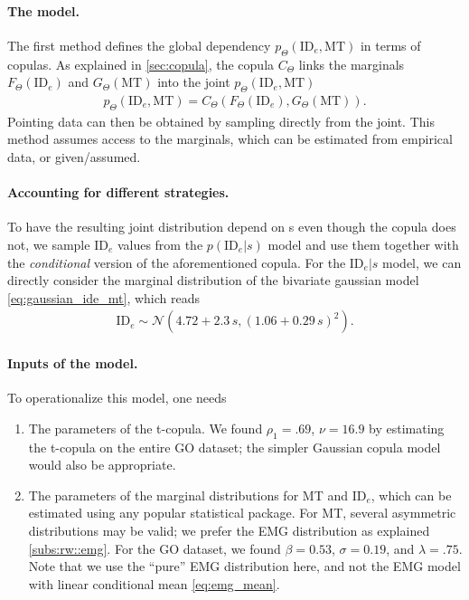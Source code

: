 \documentclass[acmlarge, manuscript,review]{acmart}
\newcommand{\mt}{\ensuremath{{\text{MT}}}\xspace}
\newcommand{\ide}{\ensuremath{{\text{ID}_e}}\xspace}
\begin{document}
\paragraph{The model.} The first method defines the global dependency $p_{\Theta}(\ide, \mt)$ in terms of copulas. As explained in \autoref{sec:copula}, the copula $C_{\Theta}$ links the marginals $F_{\Theta}(\ide)$ and $G_{\Theta}(\mt)$ into the joint $p_{\Theta}(\ide, \mt)$
\begin{align}
	p_{\Theta}(\ide, \mt) = C_{\Theta}(F_{\Theta}(\ide), G_{\Theta}(\mt)).
\end{align}
Pointing data can then be obtained by sampling directly from the joint. This method assumes access to the marginals, which can be estimated from empirical data, or given/assumed.

\paragraph{Accounting for different strategies.} To have the resulting joint distribution depend on s even though the copula does not, we sample \ide values from the $p(\ide | s)$ model and use them together with the \textit{conditional} version of the aforementioned copula.
For the $\ide|s$ model, we can directly consider the marginal distribution of the bivariate gaussian model \autoref{eq:gaussian_ide_mt}, which reads
\begin{align}
	\ide \sim \mathcal{N}(4.72 + 2.3\,s, (1.06 + 0.29\,s)^2). \label{eq:gauss_strategy_marginal}
\end{align}

\paragraph{Inputs of the model.} To operationalize this model, one needs
\begin{enumerate}
	\item The parameters of the t-copula. We found $\rho_1 = .69$, $\nu = 16.9$ by estimating the t-copula on the entire GO dataset; the simpler Gaussian copula model would also be appropriate.
	\item The parameters of the marginal distributions for MT and \ide, which can be estimated using any popular statistical package. For MT, several asymmetric distributions may be valid; we prefer the EMG distribution as explained \autoref{subs:rw::emg}. For the GO dataset, we found $\beta = 0.53$, $\sigma = 0.19$, and $\lambda= .75$. Note that we use the ``pure'' EMG distribution here, and not the EMG model with linear conditional mean \autoref{eq:emg_mean}.
\end{enumerate}
\end{document}
